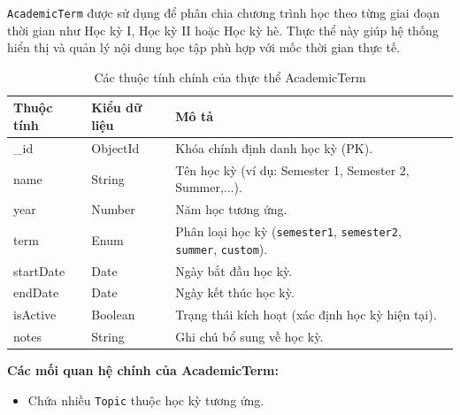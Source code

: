 \texttt{AcademicTerm} được sử dụng để phân chia chương trình học theo từng giai đoạn thời gian như Học kỳ I, Học kỳ II hoặc Học kỳ hè. 
Thực thể này giúp hệ thống hiển thị và quản lý nội dung học tập phù hợp với mốc thời gian thực tế.
\begin{table}[H]
	\centering
	\begin{tabularx}{\textwidth}{|l|l|X|}
		\hline
		\textbf{Thuộc tính} & \textbf{Kiểu dữ liệu} & \textbf{Mô tả} \\ \hline
		\_id & ObjectId & Khóa chính định danh học kỳ (PK). \\ \hline
		name & String & Tên học kỳ (ví dụ: Semester 1, Semester 2, Summer,...). \\ \hline
		year & Number & Năm học tương ứng. \\ \hline
		term & Enum & Phân loại học kỳ (\texttt{semester1}, \texttt{semester2}, \texttt{summer}, \texttt{custom}). \\ \hline
		startDate & Date & Ngày bắt đầu học kỳ. \\ \hline
		endDate & Date & Ngày kết thúc học kỳ. \\ \hline
		isActive & Boolean & Trạng thái kích hoạt (xác định học kỳ hiện tại). \\ \hline
		notes & String & Ghi chú bổ sung về học kỳ. \\ \hline
	\end{tabularx}
	\caption{Các thuộc tính chính của thực thể AcademicTerm}
\end{table}
\newline
\textbf{Các mối quan hệ chính của AcademicTerm:}
\begin{itemize}
	\item Chứa nhiều \texttt{Topic} thuộc học kỳ tương ứng.
\end{itemize}

